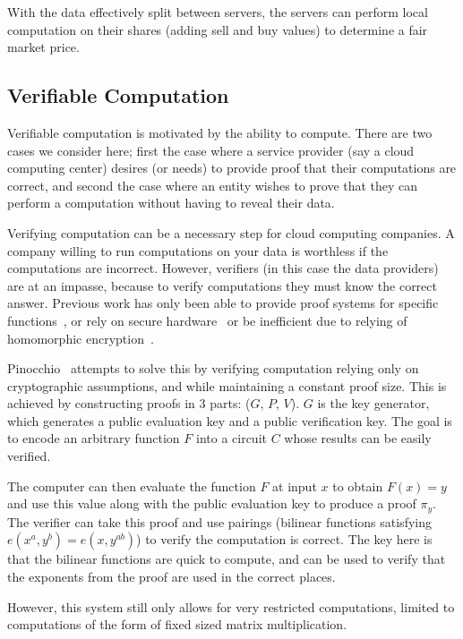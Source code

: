 With the data effectively split between servers, the servers can perform local
computation on their shares (adding sell and buy values) to determine a fair
market price.

\subsection{Verifiable Computation}\label{ssec:verifiableComputation}
Verifiable computation is motivated by the ability to compute. There are two
cases we consider here; first the case where a service provider (say a cloud
computing center) desires (or needs) to provide proof that their computations
are correct, and second the case where an entity wishes to prove that they can
perform a computation without having to reveal their data.

Verifying computation can be a necessary step for cloud computing companies. A
company willing to run computations on your data is worthless if the
computations are incorrect. However, verifiers (in this case the data providers)
are at an impasse, because to verify computations they must know the correct
answer.  Previous work has only been able to provide proof systems for specific
functions~\cite{sion2005query}, or rely on secure
hardware~\cite{anati2013innovative} or be inefficient due to relying of
homomorphic encryption~\cite{gentry2009fully}. 

Pinocchio~\cite{parno2013pinocchio} attempts to solve this by verifying
computation relying only on cryptographic assumptions, and while maintaining a
constant proof size. This is achieved by constructing proofs in 3 parts: ($G$,
$P$, $V$). $G$ is the key generator, which generates a public evaluation key and
a public verification key. The goal is to encode an arbitrary function $F$ into
a circuit $C$ whose results can be easily verified. 

The computer can then evaluate the function $F$ at input $x$ to obtain $F(x)= y$
and use this value along with the public evaluation key to produce a proof
$\pi_y$. The verifier can take this proof and use pairings (bilinear functions
satisfying $e(x^a,y^b) = e(x,y^{ab})$) to verify the computation is correct. The
key here is that the bilinear functions are quick to compute, and can be used to
verify that the exponents from the proof are used in the correct places.

However, this system still only allows for very restricted computations, limited
to computations of the form of fixed sized matrix multiplication.

